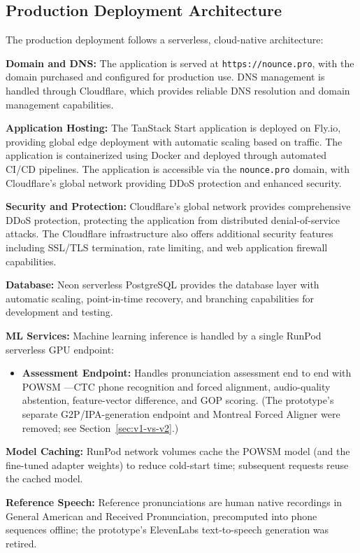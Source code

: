 \documentclass[a4paper,12pt]{report}
\begin{document}
\subsection{Production Deployment Architecture}

The production deployment follows a serverless, cloud-native architecture:

\textbf{Domain and DNS:} The application is served at \texttt{https://nounce.pro}, with the domain purchased and configured for production use. DNS management is handled through Cloudflare, which provides reliable DNS resolution and domain management capabilities.

\textbf{Application Hosting:} The TanStack Start application is deployed on Fly.io, providing global edge deployment with automatic scaling based on traffic. The application is containerized using Docker and deployed through automated CI/CD pipelines. The application is accessible via the \texttt{nounce.pro} domain, with Cloudflare's global network providing DDoS protection and enhanced security.

\textbf{Security and Protection:} Cloudflare's global network provides comprehensive DDoS protection, protecting the application from distributed denial-of-service attacks. The Cloudflare infrastructure also offers additional security features including SSL/TLS termination, rate limiting, and web application firewall capabilities.

\textbf{Database:} Neon serverless PostgreSQL provides the database layer with automatic scaling, point-in-time recovery, and branching capabilities for development and testing.

\textbf{ML Services:} Machine learning inference is handled by a single RunPod serverless GPU endpoint:
\begin{itemize}
    \item \textbf{Assessment Endpoint:} Handles pronunciation assessment end to end with POWSM \cite{powsm}---CTC phone recognition and forced alignment, audio-quality abstention, feature-vector difference, and GOP scoring. (The prototype's separate G2P/IPA-generation endpoint and Montreal Forced Aligner were removed; see Section~\ref{sec:v1-vs-v2}.)
\end{itemize}

\textbf{Model Caching:} RunPod network volumes cache the POWSM \cite{powsm} model (and the fine-tuned adapter weights) to reduce cold-start time; subsequent requests reuse the cached model.

\textbf{Reference Speech:} Reference pronunciations are human native recordings in General American and Received Pronunciation, precomputed into phone sequences offline; the prototype's ElevenLabs text-to-speech generation was retired.
\end{document}
